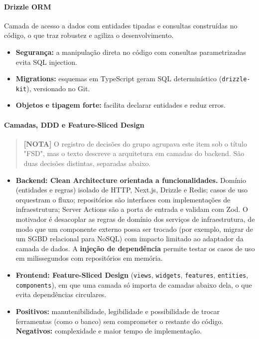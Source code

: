 \documentclass[
  brazilian,
  11pt,
]{article}
\providecommand{\tightlist}{%
  \setlength{\itemsep}{0pt}\setlength{\parskip}{0pt}}
\begin{document}
\paragraph{Drizzle ORM}\label{drizzle-orm}

Camada de acesso a dados com entidades tipadas e consultas construídas no código, o que traz robustez e agiliza o desenvolvimento.

\begin{itemize}
\tightlist
\item
  \textbf{Segurança:} a manipulação direta no código com consultas parametrizadas evita SQL injection.
\item
  \textbf{Migrations:} esquemas em TypeScript geram SQL determinístico (\texttt{drizzle-kit}), versionado no Git.
\item
  \textbf{Objetos e tipagem forte:} facilita declarar entidades e reduz erros.
\end{itemize}

\paragraph{Camadas, DDD e Feature-Sliced Design}\label{camadas-ddd-e-feature-sliced-design}

\begin{quote}
\textbf{{[}NOTA{]}} O registro de decisões do grupo agrupava este item sob o título "FSD", mas o texto descreve a arquitetura em camadas do backend. São duas decisões distintas, separadas abaixo.
\end{quote}

\begin{itemize}
\tightlist
\item
  \textbf{Backend: Clean Architecture orientada a funcionalidades.} Domínio (entidades e regras) isolado de HTTP, Next.js, Drizzle e Redis; casos de uso orquestram o fluxo; repositórios são interfaces com implementações de infraestrutura; Server Actions são a porta de entrada e validam com Zod. O motivador é desacoplar as regras de domínio dos serviços de infraestrutura, de modo que um componente externo possa ser trocado (por exemplo, migrar de um SGBD relacional para NoSQL) com impacto limitado ao adaptador da camada de dados. A \textbf{injeção de dependência} permite testar os casos de uso em milissegundos com repositórios em memória.
\item
  \textbf{Frontend: Feature-Sliced Design} (\texttt{views}, \texttt{widgets}, \texttt{features}, \texttt{entities}, \texttt{components}), em que uma camada só importa de camadas abaixo dela, o que evita dependências circulares.
\item
  \textbf{Positivos:} manutenibilidade, legibilidade e possibilidade de trocar ferramentas (como o banco) sem comprometer o restante do código. \textbf{Negativos:} complexidade e maior tempo de implementação.
\end{itemize}
\end{document}

